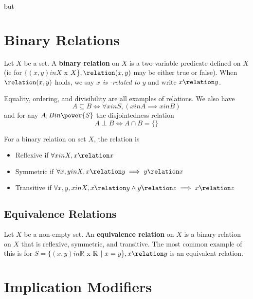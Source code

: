 \documentclass[12pt]{article}
\newcommand{\R}[1]{\mathbb{R}^{#1}}
\begin{document}
but
\proposition{$\exists y in \R{}, \forall x in \R{} \suchthat y < x$}




\section*{Binary Relations}
Let $X$ be a set. A {\bf binary relation} on $X$ is a two-variable predicate \relation defined on $X$ (ie for $\{ (x,y) in X$ x $X \}, \relation (x,y)$ may be either true or false). When $\relation (x,y)$ holds, we say \emph{$x$ is \relation -related to $y$} and write $x \relation y$.

Equality, ordering, and divisibility are all examples of relations. We also have \[ A \subseteq B \iff \forall x in S, (x in A \implies x in B) \] and for any $A, B in \power{S}$ the disjointedness relation \[ A \perp B \iff A \cap B = \{ \} \]

For a binary relation on set $X$, the relation is
\begin{itemize}
\item Reflexive if $\forall x in X, x \relation x$
\item Symmetric if $\forall x, y in X, x \relation y \implies y \relation x$
\item Transitive if $\forall x, y, x in X, x \relation y \land y \relation z \implies x \relation z$
\end{itemize}

\subsection*{Equivalence Relations}
Let $X$ be a non-empty set. An {\bf equivalence relation} on $X$ is a binary relation on $X$ that is reflexive, symmetric, and transitive. The most common example of this is for $S = \{ (x,y) in \R{}$ x $\R{} \suchthat x = y \}, x \relation y$ is an equivalent relation.

\section*{Implication Modifiers}
\end{document}

